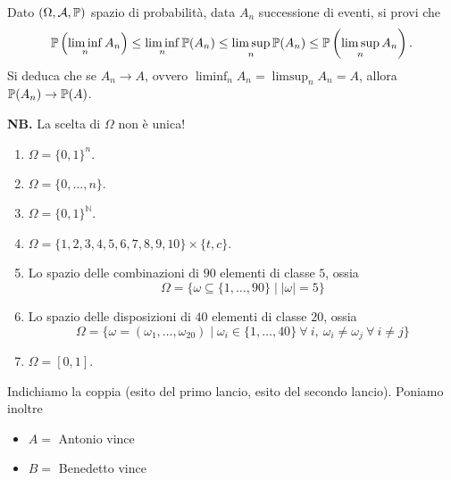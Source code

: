Dato $( \Omega ,\mathcal{A} ,\P)$ spazio di probabilità, data $A_{n}$ successione di eventi, si provi che
\begin{equation*}
\P\left(\liminf _{n} A_{n}\right) \leq \liminf _{n}\P( A_{n}) \leq \limsup _{n}\P( A_{n})\leq \mathbb{P}\left(\limsup _{n} A_{n}\right) .
\end{equation*}
Si deduca che se $A_{n}\rightarrow A$, ovvero $\liminf_{n} A_{n} =\limsup _{n} A_{n} =A$, allora $\P( A_{n})\rightarrow \P( A)$.



\ParteSoluzioni










\Soluzione

\textbf{NB.} La scelta di $\Omega $ non è unica!
\begin{enumerate}
\item $\Omega =\{0,1\}^{n} .$
\item $\Omega =\{0,\dots ,n\}$.
\item $\Omega =\{0,1\}^{\mathbb{N}}$.
\item $\Omega =\{1,2,3,4,5,6,7,8,9,10\} \times \{t,c\}$.
\item Lo spazio delle combinazioni di $90$ elementi di classe $5$, ossia\begin{equation*}
\Omega =\{\omega \subseteq \{1,\dots ,90\} \mid |\omega |=5\}
\end{equation*}
\item Lo spazio delle disposizioni di $40$ elementi di classe $20$, ossia\begin{equation*}
\Omega =\{\omega =( \omega _{1} ,\dots ,\omega _{20}) \mid \omega _{i} \in \{1,\dots ,40\} \ \forall \ i,\ \omega _{i} \neq \omega _{j} \ \forall \ i\neq j\}
\end{equation*}
\item $\Omega =[ 0,1]$.
\end{enumerate}
\Soluzione

Indichiamo la coppia (esito del primo lancio, esito del secondo lancio). Poniamo inoltre
\begin{itemize}
\item $A=$ Antonio vince
\item $B=$ Benedetto vince
\end{itemize}

